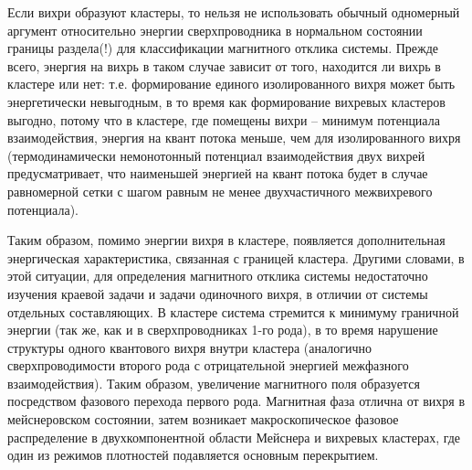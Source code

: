 Если вихри образуют кластеры, то нельзя не использовать обычный одномерный 
аргумент относительно энергии сверхпроводника в нормальном состоянии границы 
раздела(!) для классификации магнитного отклика системы. Прежде всего, энергия 
на вихрь в таком случае зависит от того, находится ли вихрь в кластере или 
нет: т.е. формирование единого изолированного вихря может быть энергетически 
невыгодным, в то время как формирование вихревых кластеров выгодно, потому что 
в кластере, где помещены вихри -- минимум потенциала взаимодействия, энергия 
на квант потока меньше, чем для изолированного вихря (термодинамически 
немонотонный потенциал взаимодействия двух вихрей предусматривает, что 
наименьшей энергией на квант потока будет в случае равномерной сетки с шагом 
равным не менее двухчастичного межвихревого потенциала).

Таким образом, помимо энергии вихря в кластере, появляется дополнительная 
энергическая характеристика, связанная с границей кластера. Другими словами, в 
этой ситуации, для определения магнитного отклика системы недостаточно 
изучения краевой задачи и задачи одиночного вихря, в отличии от системы 
отдельных составляющих. В кластере система стремится к минимуму граничной 
энергии (так же, как и в сверхпроводниках 1-го рода), в то время нарушение 
структуры одного квантового вихря внутри кластера (аналогично 
сверхпроводимости второго рода с отрицательной энергией межфазного 
взаимодействия). Таким образом, увеличение магнитного поля образуется 
посредством фазового перехода первого рода. Магнитная фаза отлична от вихря в 
мейснеровском состоянии, затем возникает макроскопическое фазовое 
распределение в двухкомпонентной области Мейснера и вихревых кластерах, где 
один из режимов плотностей подавляется основным перекрытием. \cite{bib:main}

\newpage